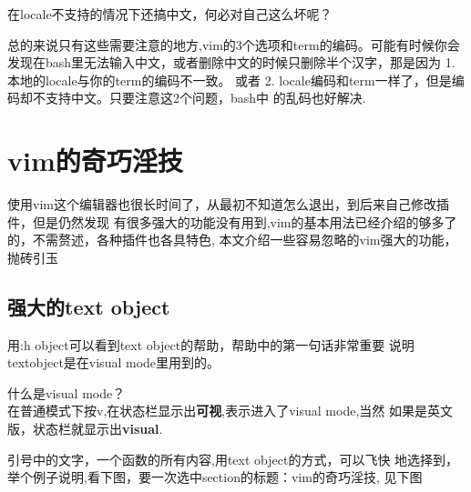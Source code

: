 \documentclass[adobefonts]{ctexart}
\begin{document}
在locale不支持的情况下还搞中文，何必对自己这么坏呢？

总的来说只有这些需要注意的地方,vim的3个选项和term的编码。可能有时候你会发现在bash里无法输入中文，或者删除中文的时候只删除半个汉字，那是因为
1.本地的locale与你的term的编码不一致。 或者 2. locale编码和term一样了，但是编码却不支持中文。只要注意这2个问题，bash中
的乱码也好解决.

\section{vim的奇巧淫技}
使用vim这个编辑器也很长时间了，从最初不知道怎么退出，到后来自己修改插件，但是仍然发现
有很多强大的功能没有用到,vim的基本用法已经介绍的够多了的，不需赘述，各种插件也各具特色,
本文介绍一些容易忽略的vim强大的功能，抛砖引玉
\subsection{强大的text object}
用:h object可以看到text object的帮助，帮助中的第一句话非常重要
说明textobject是在visual mode里用到的。

什么是visual mode？\\
在普通模式下按v,在状态栏显示出\textbf{可视},表示进入了visual mode,当然
如果是英文版，状态栏就显示出\textbf{visual}.

引号中的文字，一个函数的所有内容,用text object的方式，可以飞快
地选择到，举个例子说明,看下图，要一次选中section的标题：vim的奇巧淫技,
见下图
\end{document}
